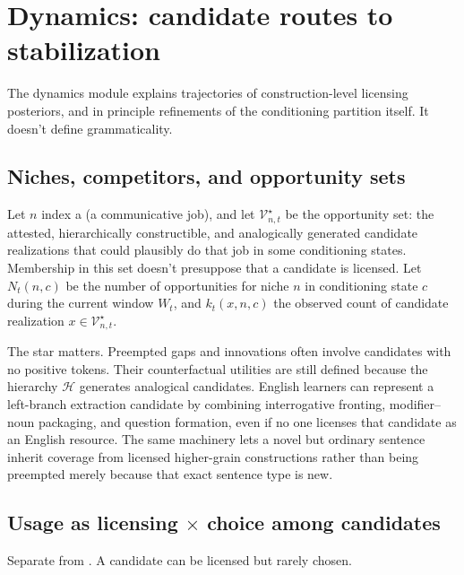 \section{Dynamics: candidate routes to stabilization}
\label{sec:dynamics}

The dynamics module explains trajectories of construction-level licensing
posteriors, and in principle refinements of the conditioning partition itself.
It doesn't define grammaticality.

\subsection{Niches, competitors, and opportunity sets}
\label{sec:niches}

Let $n$ index a  (a communicative job), and let
$\mathcal{V}_{n,t}^{\star}$ be the opportunity set: the attested,
hierarchically constructible, and analogically generated candidate realizations
that could plausibly do that job in some conditioning states. Membership in
this set doesn't presuppose that a candidate is licensed.
Let $N_t(n,c)$ be the number of opportunities for niche $n$ in conditioning
state $c$ during the current window $W_t$, and $k_t(x,n,c)$ the observed count of
candidate realization $x\in\mathcal{V}_{n,t}^{\star}$.

The star matters. Preempted gaps and innovations often involve candidates with no
positive tokens. Their counterfactual utilities are still defined because the
hierarchy $\mathcal{H}$ generates analogical candidates. English learners can
represent a left-branch extraction candidate by combining interrogative
fronting, modifier--noun packaging, and question formation, even if no one
licenses that candidate as an English resource. The same machinery lets a novel
but ordinary sentence inherit coverage from licensed higher-grain constructions
rather than being preempted merely because that exact sentence type is new.

\subsection{Usage as \texorpdfstring{licensing $\times$ choice}{licensing x choice} among candidates}
\label{sec:usage}

Separate  from . A candidate can be licensed but
rarely chosen.

